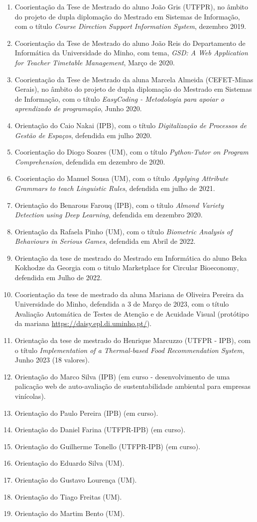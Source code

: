 \documentclass[11pt]{article}
\begin{document}
\begin{enumerate}
\item{Coorientação da Tese de Mestrado do aluno João Gris (UTFPR), no âmbito do projeto de dupla diplomação do Mestrado em Sistemas de Informação, com o título {
\em{ Course Direction Support Information System}}, dezembro 2019.}
\item{Coorientação da Tese de Mestrado do aluno João Reis do Departamento de Informática da Universidade do Minho, com tema, {
\em{ GSD: A Web Application for Teacher Timetable Management}}, Março de 2020.}
\item{Coorientação da Tese de Mestrado da aluna Marcela Almeida (CEFET-Minas Gerais), no âmbito do projeto de dupla diplomação do Mestrado em Sistemas de Informação, com o título {
\em{ EasyCoding - Metodologia para apoiar o aprendizado de programação}}, Junho 2020.}
\item{Orientação do Caio Nakai (IPB), com o título {
\em{ Digitalização de Processos de Gestão de Espaços}}, defendida em julho 2020.}
\item{Coorientação do Diogo Soares (UM), com o título {
\em{ Python-Tutor on Program Comprehension}}, defendida em dezembro de 2020.}
\item{Coorientação do Manuel Sousa (UM), com o título {
\em{ Applying Attribute Grammars to teach Linguistic Rules}}, defendida em julho de 2021.}
\item{Orientação do Benarous Farouq (IPB), com o título {
\em{ Almond Variety Detection using Deep Learning}}, defendida em dezembro 2020.}
\item{Orientação da Rafaela Pinho (UM), com o título {
\em{ Biometric Analysis of Behaviours in Serious Games}}, defendida em Abril de 2022.}
\item{Orientação da tese de mestrado do Mestrado em Informática do aluno Beka Kokhodze da Georgia com o titulo Marketplace for Circular Bioeconomy, defendida em Julho de 2022.}
\item{Coorientação da tese de mestrado da aluna Mariana de Oliveira Pereira  da Universidade do Minho, defendida a 3 de Março de 2023, com o título Avaliação Automática de Testes de Atenção e de Acuidade Visual (protótipo da mariana 
\url{https://daisy.epl.di.uminho.pt/}).}
\item{Orientação da tese de mestrado do Henrique Marcuzzo (UTFPR - IPB), com o título {
\em{ Implementation of a Thermal-based Food Recommendation System}}, Junho 2023 (18 valores). }
\item{Orientação do Marco Silva (IPB) (em curso - desenvolvimento de uma palicação web de auto-avaliação de sustentabilidade ambiental para empresas vinícolas).}
\item{Orientação do Paulo Pereira (IPB) (em curso).}
\item{Orientação do Daniel Farina (UTFPR-IPB) (em curso).}
\item{Orientação do Guilherme Tonello (UTFPR-IPB) (em curso).}
\item{Orientação do Eduardo Silva (UM).}
\item{Orientação do Gustavo Lourença (UM).}
\item{Orientação do Tiago Freitas (UM).}
\item{Orientação do Martim Bento (UM).}
\end{enumerate}
\end{document}
